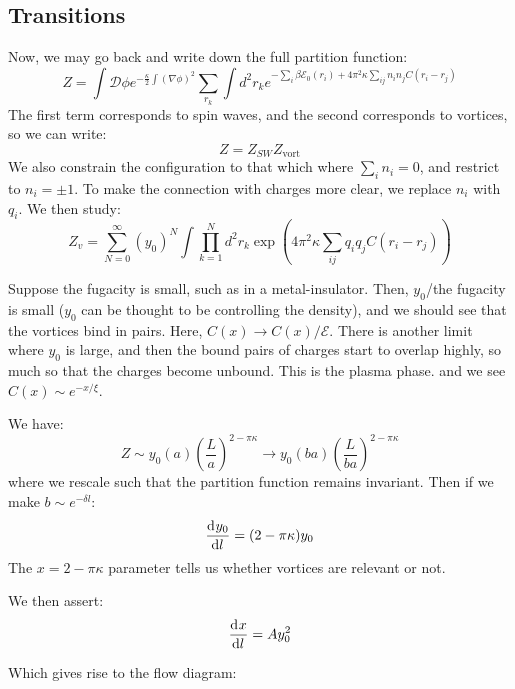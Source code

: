 \subsection{Transitions}
Now, we may go back and write down the full partition function:
\begin{equation}
    Z = \int \mathcal{D}\phi e^{-\frac{\kappa}{2}\int (\nabla \phi)^2}\sum_{r_k}\int d^2r_k e^{-\sum_i \beta\mathcal{E}_0(r_i) + 4\pi^2\kappa \sum_{ij} n_i n_j C(r_i - r_j)}
\end{equation}
The first term corresponds to spin waves, and the second corresponds to vortices, so we can write:
\begin{equation}
    Z = Z_{SW}Z_{\text{vort}}
\end{equation}
We also constrain the configuration to that which where $\sum_i n_i = 0$, and restrict to $n_i = \pm 1$. To make the connection with charges more clear, we replace $n_i$ with $q_i$. We then study:
\begin{equation}
    Z_v = \sum_{N=0}^\infty (y_0)^N \int \prod_{k=1}^N d^2r_k \exp(4\pi^2\kappa\sum_{ij}q_iq_jC(r_i - r_j))
\end{equation}

Suppose the fugacity is small, such as in a metal-insulator. Then, $y_0$/the fugacity is small ($y_0$ can be thought to be controlling the density), and we should see that the vortices bind in pairs. Here, $C(x) \to C(x)/\mathcal{E}$. There is another limit where $y_0$ is large, and then the bound pairs of charges start to overlap highly, so much so that the charges become unbound. This is the plasma phase. and we see $C(x) \sim e^{-x/\xi}$. 

We have:
\begin{equation}
    Z \sim y_0(a) \left(\frac{L}{a}\right)^{2-\pi\kappa} \to y_0(ba)\left(\frac{L}{ba}\right)^{2 - \pi \kappa}
\end{equation}
where we rescale such that the partition function remains invariant. Then if we make $b \sim e^{-\delta l}$:
\begin{equation}
    \dod{y_0}{l} = (2 - \pi \kappa)y_0
\end{equation}
The $x = 2 - \pi \kappa$ parameter tells us whether vortices are relevant or not.

We then assert:
\begin{equation}
    \dod{x}{l} = Ay_0^2
\end{equation}

Which gives rise to the flow diagram:

